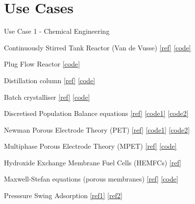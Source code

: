 \documentclass[compress,newPxFont,sthlmFooter]{beamer}
\begin{document}
\section{Use Cases} 

\begin{frame}[plain]{Use Case 1 - Chemical Engineering}
    \begin{itemize}
       {\small
          \item \alert{Continuously Stirred Tank Reactor} (Van de Vusse)
                \href{https://doi.org/10.1021/i160048a700}{[ref]} \href{http://daetools.com/docs/tutorials-chemeng.html\#tutorial-che-1}{[code]}
          \item \alert{Plug Flow Reactor}
                \href{http://daetools.com/docs/tutorials-chemeng.html\#tutorial-che-7}{[code]}
          \item \alert{Distillation column}
                \href{http://dx.doi.org/10.1016/S0098-1354(02)00120-5}{[ref]} \href{http://daetools.com/docs/tutorials-chemeng.html\#tutorial-che-2}{[code]}
          \item \alert{Batch crystalliser}
                \href{http://dx.doi.org/10.1016/j.jcrysgro.2011.06.016}{[ref]} \href{http://daetools.com/docs/tutorials-chemeng.html\#tutorial-che-3}{[code]}
          \item \alert{Discretised Population Balance equations}
                \href{http://dx.doi.org/10.20944/preprints201611.0012.v1}{[ref]} \href{http://daetools.com/docs/tutorials-chemeng.html\#tutorial-che-4}{[code1]}
                \href{http://daetools.com/docs/tutorials-chemeng.html\#tutorial-che-5}{[code2]}
          \item \alert{Newman Porous Electrode Theory} (PET) 
                \href{http://dx.doi.org/10.1007/0-306-47508-1_13}{[ref]} \href{http://daetools.com/docs/tutorials-chemeng.html\#tutorial-che-6}{[code1]}
                \href{https://github.com/raybsmith/daetools-example-battery}{[code2]}
          \item \alert{Multiphase Porous Electrode Theory} (MPET)
                \href{https://arxiv.org/abs/1702.08432}{[ref]} \href{https://bitbucket.org/bazantgroup/mpet}{[code]}
          \item \alert{Hydroxide Exchange Membrane Fuel Cells} (HEMFCs)
                \href{http://doi.org/10.1038/nnano.2016.265}{[ref]}
          \item \alert{Maxwell-Stefan equations} (porous membranes)
                \href{http://doi.org/10.1007/s10450-015-9670-z}{[ref]} \href{http://daetools.com/docs/tutorials-chemeng.html\#tutorial-che-8}{[code]}
          \item \alert{Presssure Swing Adsorption}
                \href{http://doi.org/10.1021/ie801357a}{[ref1]} \href{http://doi.org/10.1021/ie0712582}{[ref2]}
       }
    \end{itemize}
\end{frame}
\end{document}
